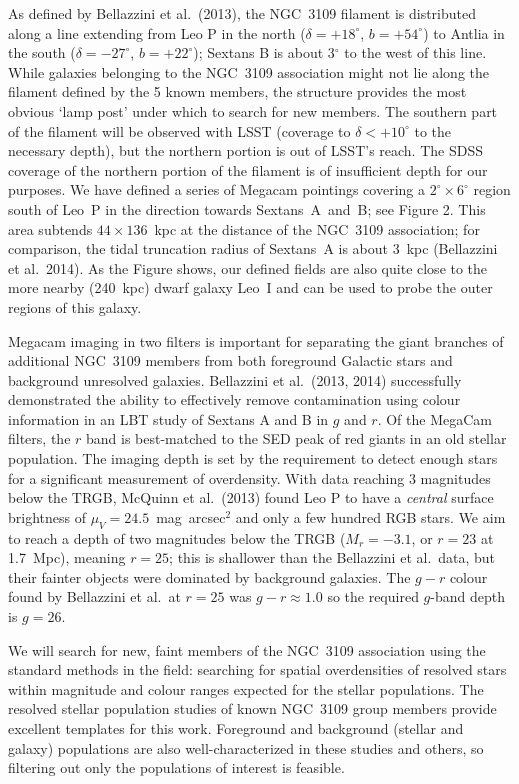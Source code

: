 As defined by Bellazzini et al.\ (2013), the NGC~3109 filament is  distributed along a line extending from Leo P in the 
north ($\delta = +18^{\circ}$, $b = +54^{\circ}$) to
Antlia in the south ($\delta = -27^{\circ}$, $b = +22^{\circ}$); Sextans B is about 3$^{\circ}$ to the west of this line.
While galaxies belonging to the NGC~3109 association might not lie along the filament defined by
the 5 known members, the structure provides the most obvious `lamp post' under which to search for new
members. The southern part of the filament will be observed with LSST (coverage to $\delta < +10^{\circ}$ to the necessary depth),
but the northern portion is out of LSST's reach. The SDSS coverage of the northern portion of the filament
is of insufficient depth for our purposes.
We have defined a series of Megacam pointings covering a $2^{\circ}\times6^{\circ}$ region south
of Leo~P in the direction towards Sextans~A~and~B; see Figure 2. This area subtends $44\times136$~kpc
at the distance of the NGC~3109 association; for comparison, the tidal truncation radius of Sextans~A is
about 3~kpc (Bellazzini et al.\ 2014). As the Figure shows,  our defined fields are also
quite close to the more nearby (240~kpc) dwarf galaxy Leo~I and can be used to probe the outer
regions of this galaxy.


Megacam imaging in two filters is important for separating the giant branches of additional NGC~3109
members from both foreground Galactic stars and background unresolved galaxies.  Bellazzini et al.\ (2013, 2014)
successfully demonstrated the ability to effectively remove contamination using colour information
in an LBT study of Sextans A and B in $g$ and $r$. Of the MegaCam filters, the $r$ band is best-matched to the SED 
peak of red giants in an old stellar population.
The imaging depth is set by the requirement to detect enough stars for a significant measurement of overdensity. 
With data reaching 3 magnitudes below the TRGB, McQuinn et al.\ (2013) found Leo P to have a {\em central} surface brightness 
of $\mu_V=24.5$~mag~arcsec$^2$ and only a few hundred RGB stars. We aim to reach 
a depth of two magnitudes below the TRGB ($M_r = -3.1$, or  $r=23$ at 1.7~Mpc), meaning $r=25$;
this is shallower than the Bellazzini et al.\  data, but their fainter objects were dominated by background galaxies. 
The $g-r$ colour found by Bellazzini et al.\ at $r=25$ was $g-r\approx 1.0$ so the required $g$-band depth is $g=26$.

We will search for new, faint members of the NGC~3109 association using the standard methods in the field:
searching for spatial overdensities of resolved stars within magnitude and colour ranges expected for the stellar populations.
The resolved stellar population studies of known NGC~3109 group members provide excellent templates for
this work. Foreground and background (stellar and galaxy) populations are also well-characterized in these
studies and others, so filtering out only the populations of interest is feasible.

